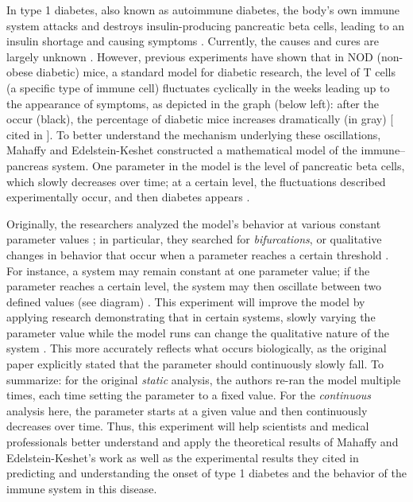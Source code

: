 
In type 1 diabetes, also known as autoimmune diabetes, the body’s own immune
system attacks and destroys insulin-producing pancreatic beta cells, leading
to an insulin shortage and causing symptoms \cite{PubMed2013}. Currently,
the causes and cures are largely unknown \cite{Daneman2006}. However,
previous experiments have shown that in NOD (non-obese diabetic) mice, a
standard model for diabetic research, the level of T cells (a specific type
of immune cell) fluctuates cyclically in the weeks leading up to the
appearance of symptoms, as depicted in the graph (below left): after the
 occur (black), the percentage of diabetic mice increases
dramatically (in gray) [\cite{Trudeau2003} cited in \cite{Mahaffy2007}]. To
better understand the mechanism underlying these oscillations, Mahaffy and
Edelstein-Keshet constructed a mathematical model of the immune–pancreas
system. One parameter in the model is the level of pancreatic beta cells,
which slowly decreases over time; at a certain level, the fluctuations
described experimentally occur, and then diabetes appears
\cite{Mahaffy2007}.


\setupcaptions[location=bottom,width=10in]


Originally, the researchers analyzed the model’s behavior at various
constant parameter values \cite{Mahaffy2007}; in particular, they searched
for {\em bifurcations}, or qualitative changes in behavior that occur when a
parameter reaches a certain threshold \cite{VanVoorn2006}. For instance, a
system may remain constant at one parameter value; if the parameter reaches
a certain level, the system may then oscillate between two defined values
(see diagram) \cite{VanVoorn2006}. This experiment will improve the model by
applying research demonstrating that in certain systems, slowly varying the
parameter value while the model runs can change the qualitative nature of
the system \cite{Baer1989}. This more accurately reflects what occurs
biologically, as the original paper explicitly stated that the parameter
should continuously slowly fall. To summarize: for the original {\em static}
analysis, the authors re-ran the model multiple times, each time setting the
parameter to a fixed value. For the {\em continuous} analysis here, the
parameter starts at a given value and then continuously decreases over
time. Thus, this experiment will help scientists and medical professionals
better understand and apply the theoretical results of Mahaffy and
Edelstein-Keshet’s work as well as the experimental results they cited in
predicting and understanding the onset of type 1 diabetes and the behavior
of the immune system in this disease.
